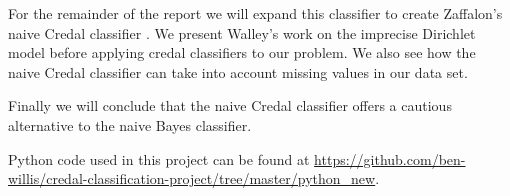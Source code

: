 For the remainder of the report we will expand this classifier to create Zaffalon's  naive Credal classifier \cite{Zaffalon01}.
We present Walley's work \cite{Walley96} on the imprecise Dirichlet model before applying credal classifiers to our problem.
We also see how the naive Credal classifier can take into account missing values in our data set.

Finally we will conclude that the naive Credal classifier offers a cautious alternative to the naive Bayes classifier.

Python code used in this project can be found at \url{https://github.com/ben-willis/credal-classification-project/tree/master/python_new}.